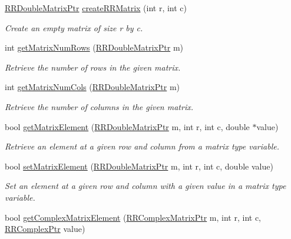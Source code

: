 \begin{DoxyCompactItemize}
\hyperlink{rrc__types_8h_ae586a879d30f0823087e42d93464b5dd}{R\-R\-Double\-Matrix\-Ptr} \hyperlink{group__helper_routines_gaf462e87fffe618001f9a090db897b014}{create\-R\-R\-Matrix} (int r, int c)
\begin{DoxyCompactList}\small\item\em Create an empty matrix of size r by c. \end{DoxyCompactList}\item 
int \hyperlink{group__helper_routines_gace79da82f227142b2b12203eb90b39c2}{get\-Matrix\-Num\-Rows} (\hyperlink{rrc__types_8h_ae586a879d30f0823087e42d93464b5dd}{R\-R\-Double\-Matrix\-Ptr} m)
\begin{DoxyCompactList}\small\item\em Retrieve the number of rows in the given matrix. \end{DoxyCompactList}\item 
int \hyperlink{group__helper_routines_ga48c14f12ed0903649369318daa595c16}{get\-Matrix\-Num\-Cols} (\hyperlink{rrc__types_8h_ae586a879d30f0823087e42d93464b5dd}{R\-R\-Double\-Matrix\-Ptr} m)
\begin{DoxyCompactList}\small\item\em Retrieve the number of columns in the given matrix. \end{DoxyCompactList}\item 
bool \hyperlink{group__helper_routines_gaaaeee435626a35220ef9329964633356}{get\-Matrix\-Element} (\hyperlink{rrc__types_8h_ae586a879d30f0823087e42d93464b5dd}{R\-R\-Double\-Matrix\-Ptr} m, int r, int c, double $\ast$value)
\begin{DoxyCompactList}\small\item\em Retrieve an element at a given row and column from a matrix type variable. \end{DoxyCompactList}\item 
bool \hyperlink{group__helper_routines_gab8c7891563c13c1e59fc65251d4a19d7}{set\-Matrix\-Element} (\hyperlink{rrc__types_8h_ae586a879d30f0823087e42d93464b5dd}{R\-R\-Double\-Matrix\-Ptr} m, int r, int c, double value)
\begin{DoxyCompactList}\small\item\em Set an element at a given row and column with a given value in a matrix type variable. \end{DoxyCompactList}\item 
bool \hyperlink{group__helper_routines_ga881e667ad97b6c4461bf54c3a265f395}{get\-Complex\-Matrix\-Element} (\hyperlink{rrc__types_8h_a8cf9e865d8541d100f153800adbb7c3f}{R\-R\-Complex\-Matrix\-Ptr} m, int r, int c, \hyperlink{rrc__types_8h_ada2046d7326c56ae29d8510fbf6622ee}{R\-R\-Complex\-Ptr} value)

\end{DoxyCompactItemize}
